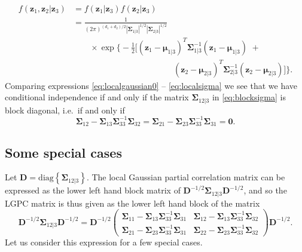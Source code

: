 \documentclass[
  12pt,
  letterpaper]{article}
\numberwithin{equation}{section}
\newcommand{\z}{\bm{z}}
\newcommand{\D}{\bm{D}}
\newcommand{\fmu}{\bm{\mu}}
\newcommand{\fSigma}{\bm{\Sigma}}
\begin{document}
\begin{align*}
f(\z_1, \z_2|\z_3) &= f(\z_1|\z_3)f(\z_2|\z_3) \\
&= \frac{1}{(2\pi)^{(d_1+d_2)/2}|\fSigma_{1|3}|^{1/2}|\fSigma_{2|3}|^{1/2}} \\
& \qquad \times \exp \Big\{-\frac{1}{2}\big[(\z_1 - \fmu_{1|3})^T\fSigma_{1|3}^{-1}(\z_1 - \fmu_{1|3}) \,\, + \\
& \qquad\qquad\qquad\qquad\qquad\qquad(\z_2 - \fmu_{2|3})^T\fSigma_{2|3}^{-1}(\z_2 - \fmu_{2|3})\big]\Big\}.
\end{align*}
Comparing expressions \eqref{eq:localgaussian0} -- \eqref{eq:localsigma} we see that we have conditional independence if and only if the matrix \(\fSigma_{12|3}\) in \eqref{eq:blocksigma} is block diagonal, i.e.~if and only if
\[\fSigma_{12} - \fSigma_{13}\fSigma_{33}^{-1} \fSigma_{32} = \fSigma_{21} - \fSigma_{23}\fSigma_{33}^{-1} \fSigma_{31} = \bm{0}.\]

\hypertarget{special-cases}{%
\subsection{Some special cases}\label{special-cases}}

Let \(\D = \textrm{diag}\left\{\fSigma_{12|3}\right\}\). The local Gaussian partial correlation matrix can be expressed as the lower left hand block matrix of \(\D^{-1/2}\fSigma_{12|3}\D^{-1/2}\), and so the LGPC matrix is thus given as the lower left hand block of the matrix
\begin{equation}
\D^{-1/2}\fSigma_{12|3}\D^{-1/2} = \D^{-1/2}\begin{pmatrix} \fSigma_{11} - \fSigma_{13}\fSigma_{33}^{-1} \fSigma_{31} & \fSigma_{12} - \fSigma_{13}\fSigma_{33}^{-1} \fSigma_{32} \\ \fSigma_{21} - \fSigma_{23}\fSigma_{33}^{-1} \fSigma_{31} & \fSigma_{22} - \fSigma_{23}\fSigma_{33}^{-1} \fSigma_{32}\end{pmatrix}\D^{-1/2}.
\label{eq:matrixdef}
\end{equation}
Let us consider this expression for a few special cases.
\end{document}
